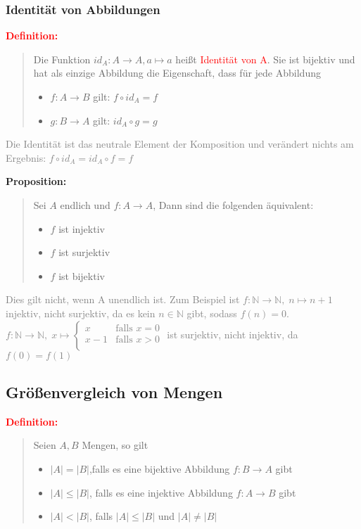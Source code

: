 \documentclass{article}
\newcommand{\red}[1]{\textcolor{red}{#1}}
\newcommand{\gray}[1]{\textcolor{gray}{#1}}
\newcommand{\dgr}[1]{\textcolor{dgr}{#1}}
\newcommand{\de}[1]{\red{\textbf{Definition: }}\begin{quote}#1\end{quote}}
\newcommand{\prop}[1]{\dgr{\textbf{Proposition: }}\begin{quote}#1\end{quote}}
\newcommand{\N}{\mathbb{N}}
\begin{document}
\newpage
\subsubsection{Identität von Abbildungen}

\de{Die Funktion $id_A: A \to A, a \mapsto a$ heißt \red{Identität von A}. Sie ist bijektiv und hat als einzige Abbildung die Eigenschaft, dass für jede Abbildung
\begin{itemize}
    \item $f: A \to B$ gilt: $f \circ id_A = f$
    \item $g: B \to A$ gilt: $id_A \circ g = g$
\end{itemize}
}
\gray{Die Identität ist das neutrale Element der Komposition und verändert nichts am Ergebnis: $f \circ id_A = id_A \circ f = f$}

\prop{Sei $A$ endlich und $f: A \to A$, Dann sind die folgenden äquivalent:
\begin{itemize}
    \item $f$ ist injektiv
    \item $f$ ist surjektiv
    \item $f$ ist bijektiv
\end{itemize}
}
\gray{Dies gilt nicht, wenn A unendlich ist. Zum Beispiel ist $f: \N \to \N, \; n \mapsto n + 1$ injektiv, nicht surjektiv, da es kein $n \in \N$ gibt, sodass $f(n) = 0$.\\
$f: \N \to \N, \; x \mapsto \begin{cases}
    x & \text{falls } x = 0\\
    x - 1 & \text{falls } x > 0\\
\end{cases}$ 
ist surjektiv, nicht injektiv, da $f(0) = f(1)$
}

\subsection{Größenvergleich von Mengen}

\de{Seien $A, B$ Mengen, so gilt
    \begin{itemize}
        \item $|A| = |B|$,falls es eine bijektive Abbildung $f: B \to A$ gibt
        \item $|A| \leq |B|$, falls es eine injektive Abbildung $f: A \to B$ gibt
        \item $|A| < |B|$, falls $|A| \leq |B|$ und $|A| \neq |B|$
    \end{itemize}
}
\end{document}

